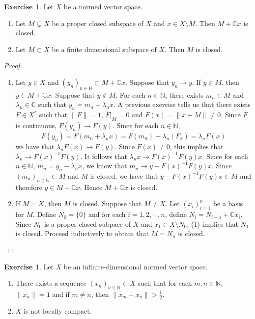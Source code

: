 \documentclass[12pt]{amsart}
\theoremstyle{definition}
\newtheorem{ex}[definition]{Exercise}
\newcommand{\lam}{\lambda}
\newcommand{\C}{\mathbb{C}}
\newcommand{\N}{\mathbb{N}}
\newcommand{\conv}[1]{\xrightarrow{#1}}
\newcommand{\lex}[1]{\label{ex:#1}}
\begin{document}
	\begin{ex} \lex{}
		Let $X$ be a normed vector space. 
		\begin{enumerate}
			\item Let $M \subsetneq X$ be a proper closed subspace of $X$ and $x \in X \setminus M$. Then $M + \C x$ is closed.
			\item Let $M \subset X$ be a finite dimensional subspace of $X$. Then $M$ is closed.
		\end{enumerate}
	\end{ex}
	
	\begin{proof}
		\begin{enumerate}
			\item Let $y \in X$ and $(y_n)_{n \in \N} \subset M+ \C x$. Suppose that $y_n \conv{} y$. If $y \in M$, then $y \in M+ \C x$. Suppose that $y \not \in M$. For each $n \in \N$, there exists $m_n \in M$ and $\lam_n \in \C$ such that $y_n = m_n + \lam_nx$. A previous exercise tells us that there exists $F \in X^*$ such that $\|F \|= 1$, $F|_M = 0$ and $F(x) = \|x+M \|\neq 0$. Since $F$ is continuous, $F(y_n) \conv{} F(y)$. Since for each $n \in \N$, $$F(y_n) = F(m_n + \lam_n x) = F(m_n)+ \lam_n (F_x) = \lam_n F(x)$$ we have that $\lam_n F(x) \conv{} F(y)$. Since $F(x) \neq 0$, this implies that $\lam_n \conv{} F(x)^{-1} F(y)$. It follows that $\lam_n x \conv{}F(x)^{-1}F(y)x$. Since  for each $n \in \N$, $m_n = y_n - \lam_nx$, we know that $m_n \conv{} y-F(x)^{-1}F(y)x$. Since $(m_n)_{n \in \N} \subset M$ and $M$ is closed, we have that $y-F(x)^{-1}F(y)x \in M$ and therefore $y \in M+\C x$. Hence $M+\C x$ is closed. \vspace{.5cm}\\
			\item If $M = X$, then $M$ is closed. Suppose that $M \neq X$. Let $(x_i)_{i=1}^n$ be a basis for $M$. Define $N_0 = \{0\}$ and for each $i =1,2, \cdots, n$, define $N_i = N_{i-1}+\C x_i$. Since $N_0$ is a proper closed subpace of $X$ and $x_1 \in X \setminus N_0$, (1) implies that $N_1$ is closed. Proceed inductively to obtain that $M = N_n$ is closed.
		\end{enumerate}
	\end{proof}
	
	\begin{ex} \lex{}
		Let $X$ be an infinite-dimensional normed vector space. 
		\begin{enumerate}
			\item There exists a sequence $(x_n)_{n\in \N} \subset X$ such that for each $m, n \in \N$, $\|x_n \|= 1$ and if $m \neq n$, then $\|x_m - x_n \|> \frac{1}{2}$.
			\item $X$ is not locally compact. 
		\end{enumerate}
	\end{ex}
	
\end{document}
